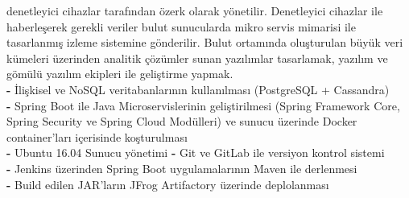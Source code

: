 \begin{multicols}{2}
{{{                denetleyici cihazlar tarafından özerk olarak yönetilir. Denetleyici cihazlar ile haberleşerek gerekli
                veriler bulut sunucularda mikro servis mimarisi ile tasarlanmış izleme sistemine gönderilir.
                Bulut ortamında oluşturulan büyük veri kümeleri üzerinden analitik çözümler sunan yazılımlar
                tasarlamak, yazılım ve gömülü yazılım ekipleri ile geliştirme yapmak. \\
                \textbf{-} İlişkisel ve NoSQL veritabanlarının kullanılması (PostgreSQL + Cassandra) \\
                \textbf{-} Spring Boot ile Java Microservislerinin geliştirilmesi
                (Spring Framework Core, Spring Security ve Spring Cloud Modülleri)
                ve sunucu üzerinde Docker container'ları içerisinde koşturulması \\
                \textbf{-} Ubuntu 16.04 Sunucu yönetimi
                \textbf{-} Git ve GitLab ile versiyon kontrol sistemi \\
                \textbf{-} Jenkins üzerinden Spring Boot uygulamalarının Maven ile derlenmesi \\
                \textbf{-} Build edilen JAR'ların  JFrog Artifactory üzerinde deplolanması
            }
        }{
        }

}
\end{multicols}

